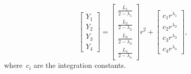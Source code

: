 \documentclass[preprint,10pt,times]{elsarticle}
\numberwithin{equation}{section}
\renewcommand{\>}{$\Rightarrow$}
\begin{document}
\begin{equation}
	\begin{bmatrix}
	 Y_{1} \\ Y_{2} \\ Y_{3} \\ Y_{4}
	\end{bmatrix}
	=
	\begin{bmatrix}
	 \frac{L_{1}}{2-\lambda_{1}} \\ \frac{L_{2}}{2-\lambda_{2}} \\ \frac{L_{3}}{2-\lambda_{3}} \\ \frac{L_{4}}{2-\lambda_{4}}
	\end{bmatrix}r^2
	+
	\begin{bmatrix}
	 c_{1} r^{\lambda_{1}} \\ c_{2} r^{\lambda_{2}} \\ c_{3} r^{\lambda_{3}} \\ c_{4} r^{\lambda_{4}}
	\end{bmatrix},
\end{equation}
where~$c_{i}$ are the integration constants.
\end{document}
